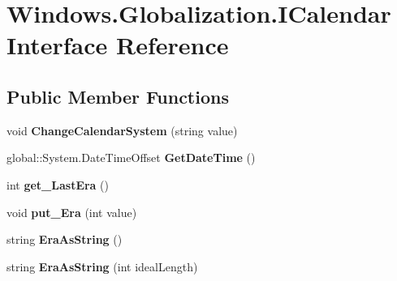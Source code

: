 \hypertarget{interface_windows_1_1_globalization_1_1_i_calendar}{}\section{Windows.\+Globalization.\+I\+Calendar Interface Reference}
\label{interface_windows_1_1_globalization_1_1_i_calendar}
\subsection*{Public Member Functions}
\begin{DoxyCompactItemize}
\item 
\mbox{\label{interface_windows_1_1_globalization_1_1_i_calendar_a92f0e2a24e26f933c47875b1e0e765dc}} 
void {\bfseries Change\+Calendar\+System} (string value)
\item 
\mbox{\label{interface_windows_1_1_globalization_1_1_i_calendar_ae411eb44570be5bac36dc531d4c41836}} 
global\+::\+System.\+Date\+Time\+Offset {\bfseries Get\+Date\+Time} ()
\item 
\mbox{\label{interface_windows_1_1_globalization_1_1_i_calendar_a7c60dabf47f20226ec202695968d05cf}} 
int {\bfseries get\+\_\+\+Last\+Era} ()
\item 
\mbox{\label{interface_windows_1_1_globalization_1_1_i_calendar_a0e8cfdc26c2bf5b1e33e39c89a0f0dbf}} 
void {\bfseries put\+\_\+\+Era} (int value)
\item 
\mbox{\label{interface_windows_1_1_globalization_1_1_i_calendar_af5e70e60f5e14a6288cc812e6a051365}} 
string {\bfseries Era\+As\+String} ()
\item 
\mbox{\label{interface_windows_1_1_globalization_1_1_i_calendar_ae6237208604b07756c78f57605b07807}} 
string {\bfseries Era\+As\+String} (int ideal\+Length)
\item 
\mbox{\label{interface_windows_1_1_globalization_1_1_i_calendar_a0f52b711eb7992aed3b32f482ad47a56}} 

\end{DoxyCompactItemize}
